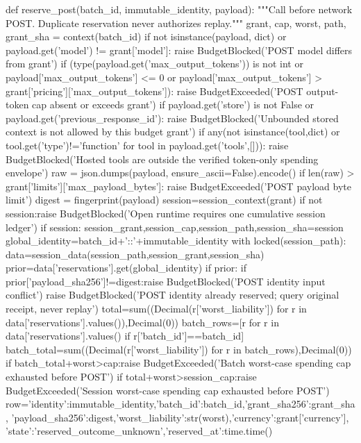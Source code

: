 def reserve_post(batch_id, immutable_identity, payload):
    """Call before network POST. Duplicate reservation never authorizes replay."""
    grant, cap, worst, path, grant_sha = context(batch_id)
    if not isinstance(payload, dict) or payload.get('model') != grant['model']:
        raise BudgetBlocked('POST model differs from grant')
    if (type(payload.get('max_output_tokens')) is not int or payload['max_output_tokens'] <= 0
            or payload['max_output_tokens'] > grant['pricing']['max_output_tokens']):
        raise BudgetExceeded('POST output-token cap absent or exceeds grant')
    if payload.get('store') is not False or payload.get('previous_response_id'):
        raise BudgetBlocked('Unbounded stored context is not allowed by this budget grant')
    if any(not isinstance(tool,dict) or tool.get('type')!='function' for tool in payload.get('tools',[])):
        raise BudgetBlocked('Hosted tools are outside the verified token-only spending envelope')
    raw = json.dumps(payload, ensure_ascii=False).encode()
    if len(raw) > grant['limits']['max_payload_bytes']: raise BudgetExceeded('POST payload byte limit')
    digest = fingerprint(payload)
    session=session_context(grant)
    if not session:raise BudgetBlocked('Open runtime requires one cumulative session ledger')
    if session:
        session_grant,session_cap,session_path,session_sha=session
        global_identity=batch_id+'::'+immutable_identity
        with locked(session_path):
            data=session_data(session_path,session_grant,session_sha)
            prior=data['reservations'].get(global_identity)
            if prior:
                if prior['payload_sha256']!=digest:raise BudgetBlocked('POST identity input conflict')
                raise BudgetBlocked('POST identity already reserved; query original receipt, never replay')
            total=sum((Decimal(r['worst_liability']) for r in data['reservations'].values()),Decimal(0))
            batch_rows=[r for r in data['reservations'].values() if r['batch_id']==batch_id]
            batch_total=sum((Decimal(r['worst_liability']) for r in batch_rows),Decimal(0))
            if batch_total+worst>cap:raise BudgetExceeded('Batch worst-case spending cap exhausted before POST')
            if total+worst>session_cap:raise BudgetExceeded('Session worst-case spending cap exhausted before POST')
            row={'identity':immutable_identity,'batch_id':batch_id,'grant_sha256':grant_sha,
                'payload_sha256':digest,'worst_liability':str(worst),'currency':grant['currency'],
                'state':'reserved_outcome_unknown','reserved_at':time.time()}

